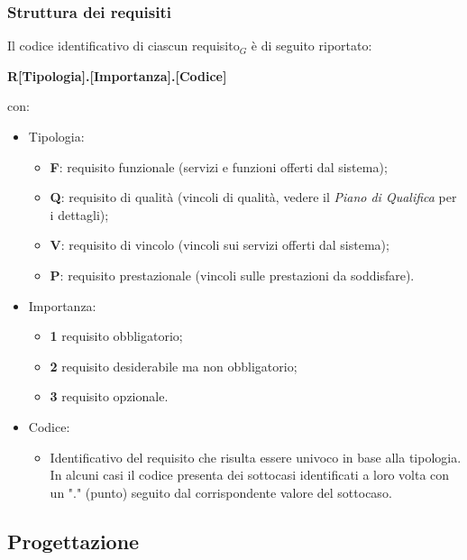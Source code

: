     \subsubsection{Struttura dei requisiti}
      Il codice identificativo di ciascun requisito$_G$ è di seguito riportato:
      \begin{center}
        \textbf{R[Tipologia].[Importanza].[Codice]}\\
      \end{center}
      con:
      \begin{itemize}
        \item Tipologia:
        \begin{itemize}
          \item \textbf{F}: requisito funzionale (servizi e funzioni offerti dal sistema);
          \item \textbf{Q}: requisito di qualità (vincoli di qualità, vedere il \textit{Piano di Qualifica} per i dettagli);
          \item \textbf{V}: requisito di vincolo (vincoli sui servizi offerti dal sistema);
          \item \textbf{P}: requisito prestazionale (vincoli sulle prestazioni da soddisfare).
        \end{itemize}

        \item Importanza:
        \begin{itemize}
          \item \textbf{1} requisito obbligatorio;
          \item \textbf{2} requisito desiderabile ma non obbligatorio;
          \item \textbf{3} requisito opzionale.
        \end{itemize}

        \item Codice:
        \begin{itemize}
          \item Identificativo del requisito che risulta essere univoco in base alla tipologia. In alcuni casi il codice presenta dei sottocasi identificati a loro volta con un "." (punto) seguito dal corrispondente valore del sottocaso.
        \end{itemize}

      \end{itemize}

  \subsection{Progettazione}
